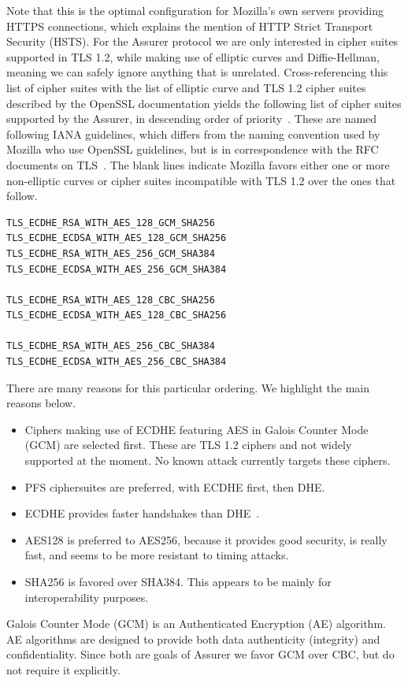 Note that this is the optimal configuration for Mozilla's own servers providing HTTPS connections, which explains the mention of HTTP Strict Transport Security (HSTS). For the Assurer protocol we are only interested in cipher suites supported in TLS 1.2, while making use of elliptic curves and Diffie-Hellman, meaning we can safely ignore anything that is unrelated. Cross-referencing this list of cipher suites with the list of elliptic curve and TLS 1.2 cipher suites described by the OpenSSL documentation yields the following list of cipher suites supported by the Assurer, in descending order of priority~\cite{openssl}. These are named following IANA guidelines, which differs from the naming convention used by Mozilla who use OpenSSL guidelines, but is in correspondence with the RFC documents on TLS~\cite{tlsparams}. The blank lines indicate Mozilla favors either one or more non-elliptic curves or cipher suites incompatible with TLS 1.2 over the ones that follow.
\begin{verbatim}
TLS_ECDHE_RSA_WITH_AES_128_GCM_SHA256
TLS_ECDHE_ECDSA_WITH_AES_128_GCM_SHA256
TLS_ECDHE_RSA_WITH_AES_256_GCM_SHA384
TLS_ECDHE_ECDSA_WITH_AES_256_GCM_SHA384

TLS_ECDHE_RSA_WITH_AES_128_CBC_SHA256
TLS_ECDHE_ECDSA_WITH_AES_128_CBC_SHA256

TLS_ECDHE_RSA_WITH_AES_256_CBC_SHA384
TLS_ECDHE_ECDSA_WITH_AES_256_CBC_SHA384
\end{verbatim}
There are many reasons for this particular ordering. We highlight the main reasons below. 
\begin{itemize}
  \item Ciphers making use of ECDHE featuring AES in Galois Counter Mode (GCM) are selected first. These are TLS 1.2 ciphers and not widely supported at the moment. No known attack currently targets these ciphers.
  \item PFS ciphersuites are preferred, with ECDHE first, then DHE.
	\item ECDHE provides faster handshakes than DHE~\cite{bernat2011ssl,pfsprice}.
  \item AES128 is preferred to AES256, because it provides good security, is really fast, and seems to be more resistant to timing attacks.
  \item SHA256 is favored over SHA384. This appears to be mainly for interoperability purposes.
\end{itemize}
Galois Counter Mode (GCM) is an Authenticated Encryption (AE) algorithm. AE algorithms are designed to provide both data authenticity (integrity) and confidentiality. Since both are goals of Assurer we favor GCM over CBC, but do not require it explicitly.

